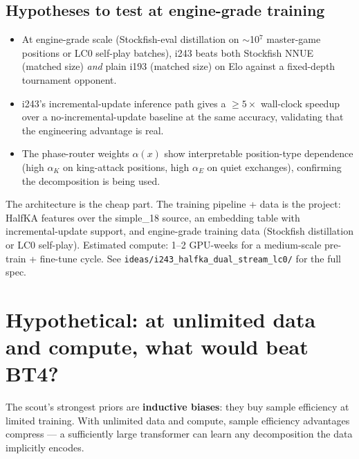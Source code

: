 \documentclass[10pt,a4paper]{article}
\begin{document}
\subsection{Hypotheses to test at engine-grade training}

\begin{itemize}
\item[\textbf{H1}] At engine-grade scale (Stockfish-eval distillation on
$\sim$10$^{7}$ master-game positions or LC0 self-play batches), i243 beats
both Stockfish NNUE (matched size) \emph{and} plain i193 (matched size) on
Elo against a fixed-depth tournament opponent.
\item[\textbf{H2}] i243's incremental-update inference path gives a
$\geq 5\times$ wall-clock speedup over a no-incremental-update baseline at
the same accuracy, validating that the engineering advantage is real.
\item[\textbf{H3}] The phase-router weights $\alpha(x)$ show interpretable
position-type dependence (high $\alpha_K$ on king-attack positions, high
$\alpha_E$ on quiet exchanges), confirming the decomposition is being used.
\end{itemize}

\begin{tcolorbox}[callout, title=Status: proposed only]
The architecture is the cheap part.  The training pipeline + data is the
project: HalfKA features over the simple\_18 source, an embedding table
with incremental-update support, and engine-grade training data (Stockfish
distillation or LC0 self-play).  Estimated compute: 1--2 GPU-weeks for a
medium-scale pre-train + fine-tune cycle.  See
\texttt{ideas/i243\_halfka\_dual\_stream\_lc0/} for the full spec.
\end{tcolorbox}

\clearpage
\section{Hypothetical: at unlimited data and compute, what would beat BT4?}

The scout's strongest priors are \textbf{inductive biases}: they buy
sample efficiency at limited training. With unlimited data and compute,
sample efficiency advantages compress --- a sufficiently large transformer
can learn any decomposition the data implicitly encodes.
\end{document}
